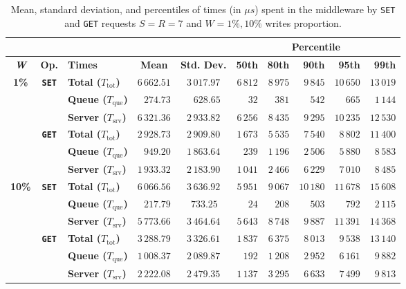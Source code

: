 \documentclass[11pt]{article}
\theoremstyle{definition}
\newcommand\Ttot{T_{\mathrm{tot}}}
\newcommand\Tque{T_{\mathrm{que}}}
\newcommand\Tsrv{T_{\mathrm{srv}}}
\renewcommand\b[1]{{\bf{#1}}}
\renewcommand\t\texttt
\begin{document}
\begin{table}[h]
    \centering
    \small
    {
        \smallskip
        \begin{tabular}{|c|c|l||r|c||r|r|r|r|r|}
            \cline{6-10}
            \multicolumn{5}{c|}{} & \multicolumn{5}{c|}{\b{Percentile}}\\ 
            \hline
            \b{\b{\textit W}} & \b{Op.} & \b{Times} & \multicolumn{1}{c|}{\b{Mean}} & \multicolumn{1}{c||}{\b{Std. Dev.}} & \b{50th} & \b{80th} & \b{90th} & \b{95th} & \b{99th} \\
            \hline
            \hline
            \multirow{6}{*}{\bf1\%} & \multirow{3}{*}{\bf\t{SET}} & \b{Total ($\Ttot$)} & $6\,662.51$ & $3\,017.97$ & $6\,812$ & $8\,975$ & $9\,845$ & $10\,650$ & $13\,019$ \\
            && \b{Queue ($\Tque$)} & $274.73$ & $\;\;\,628.65$ & $32$ & $381$ & $542$ & $665$ & $1\,144$ \\ 
            && \b{Server ($\Tsrv$)} & $6\,321.36$ & $2\,933.82$ & $6\,256$ & $8\,435$ & $9\,295$ & $10\,235$ & $12\,530$ \\
            \cline{2-10}
            & \multirow{3}{*}{\bf\t{GET}} & \b{Total ($\Ttot$)} & $2\,928.73$ & $2\,909.80$ & $1\,673$ & $5\,535$ & $7\,540$ & $8\,802$ & $11\,400$ \\
            && \b{Queue ($\Tque$)} & $949.20$ & $1\,863.64$ & $239$ & $1\,196$ & $2\,506$ & $5\,880$ & $8\,583$ \\ 
            && \b{Server ($\Tsrv$)} & $1\,933.32$ & $2\,183.90$ & $1\,041$ & $2\,466$ & $6\,229$ & $7\,010$ & $8\,485$ \\ 
            \hline
            \hline
            \multirow{6}{*}{\bf10\%} & \multirow{3}{*}{\bf\t{SET}} & \b{Total ($\Ttot$)} & $6\,066.56$ & $3\,636.92$ & $5\,951$ & $9\,067$ & $10\,180$ & $11\,678$ & $15\,608$ \\
            && \b{Queue ($\Tque$)} & $217.79$ & \;\;\,$733.25$ & $24$ & $208$ & $503$ & $792$ & $2\,115$ \\ 
            && \b{Server ($\Tsrv$)} & $5\,773.66$ & $3\,464.64$ & $5\,643$ & $8\,748$ & $9\,887$ & $11\,391$ & $14\,368$ \\
            \cline{2-10}
            & \multirow{3}{*}{\bf\t{GET}} & \b{Total ($\Ttot$)} & $3\,288.79$ & $3\,326.61$ & $1\,837$ & $6\,375$ & $8\,013$ & $9\,538$ & $13\,140$ \\
            && \b{Queue ($\Tque$)} & $1\,008.37$ & $2\,089.87$ & $192$ & $1\,208$ & $2\,952$ & $6\,161$ & $9\,882$ \\ 
            && \b{Server ($\Tsrv$)} & $2\,222.08$ & $2\,479.35$ & $1\,137$ & $3\,295$ & $6\,633$ & $7\,499$ & $9\,813$ \\ 
            \hline
        \end{tabular}
    }
    \caption{Mean, standard deviation, and percentiles of times (in $\mu s$) spent in the middleware by \t{SET} and \t{GET} requests $S=R=7$ and $W=1\%,10\%$ writes proportion.}
    \label{tab:05_breakdown}
\end{table}
\end{document}
